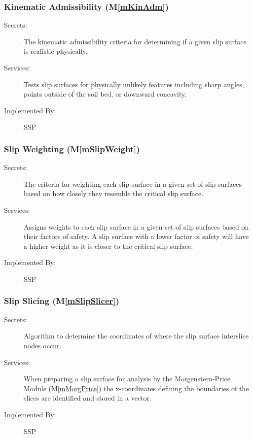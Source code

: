 \documentclass[12pt, titlepage]{article}
\newcommand{\progname}{SSP}
\newcommand{\mref}[1]{M\ref{#1}}
\begin{document}
\subsubsection{Kinematic Admissibility (\mref{mKinAdm})}

\begin{description}
\item[Secrets:] The kinematic admissibility criteria for determining if a given 
slip surface is realistic physically.
\item[Services:] Tests slip surfaces for physically unlikely features including 
sharp angles, points outside of the soil bed, or downward concavity.
\item[Implemented By:] \progname
\end{description} 

\subsubsection{Slip Weighting (\mref{mSlipWeight})}

\begin{description}
\item[Secrets:] The criteria for weighting each slip surface in a given set of 
slip surfaces based on how closely they resemble the critical slip surface.
\item[Services:] Assigns weights to each slip surface in a given set of slip 
surfaces based on their factors of safety. A slip surface with a lower factor 
of safety will have a higher weight as it is closer to the critical slip 
surface.
\item[Implemented By:] \progname
\end{description} 

\subsubsection{Slip Slicing (\mref{mSlipSlicer})}

\begin{description}
	\item[Secrets:] Algorithm to determine the coordinates of where the
	slip surface interslice nodes occur.
	\item[Services:] When preparing a slip surface for analysis by the
	Morgenstern-Price Module (\mref{mMorgPrice}) the x-coordinates defining the 
	boundaries of the slices are identified and stored in a vector.
	\item[Implemented By:] \progname
\end{description} 
\end{document}

